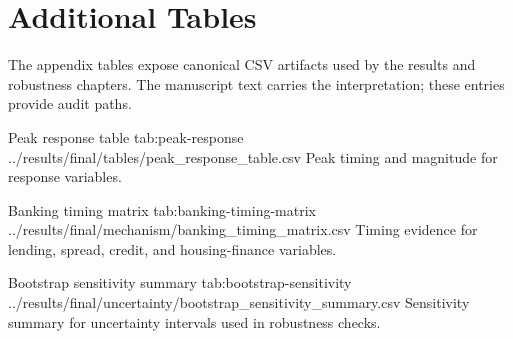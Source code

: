 \section{Additional Tables}
\label{app:additional-tables}

The appendix tables expose canonical CSV artifacts used by the results and robustness chapters. The manuscript text carries the interpretation; these entries provide audit paths.

\artifacttable
  {Peak response table}
  {tab:peak-response}
  {../results/final/tables/peak_response_table.csv}
  {Peak timing and magnitude for response variables.}

\artifacttable
  {Banking timing matrix}
  {tab:banking-timing-matrix}
  {../results/final/mechanism/banking_timing_matrix.csv}
  {Timing evidence for lending, spread, credit, and housing-finance variables.}

\artifacttable
  {Bootstrap sensitivity summary}
  {tab:bootstrap-sensitivity}
  {../results/final/uncertainty/bootstrap_sensitivity_summary.csv}
  {Sensitivity summary for uncertainty intervals used in robustness checks.}
